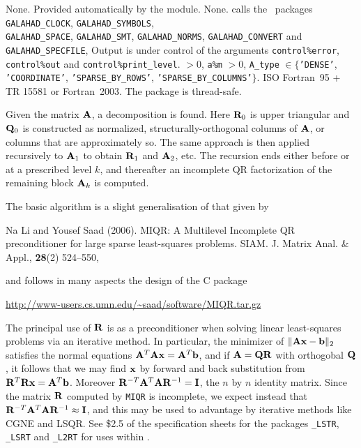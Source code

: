 \documentclass{galahad}
\newcommand{\packagename}{MIQR}
\begin{document}

\galgeneral

\galcommon None.
\galworkspace Provided automatically by the module.
\galroutines None.
\galmodules {\tt \packagename\_form} calls the \galahad\ packages
{\tt GALAHAD\_CLOCK},
{\tt GALAHAD\_SY\-M\-BOLS}, \\
{\tt GALAHAD\-\_SPACE},
{\tt GALAHAD\_SMT},
{\tt GALAHAD\_NORMS},
{\tt GALAHAD\_CONVERT} and
{\tt GALAHAD\_SPECFILE},
\galio Output is under control of the arguments
 {\tt control\%error}, {\tt control\%out} and {\tt control\%print\_level}.
 $> 0$, {\tt a\%m} $>  0$,
{\tt A\_type} $\in \{${\tt 'DENSE'},  {\tt 'COORDINATE'},
{\tt 'SPARSE\_BY\_ROWS'}, {\tt 'SPARSE\_BY\_COLUMNS'}$\}$.
\galportability ISO Fortran~95 + TR 15581 or Fortran~2003.
The package is thread-safe.



\galmethod

Given the matrix ${\mathbf{A}}$, a decomposition
is found. Here ${\mathbf{R}}_0$ is upper triangular and
${\mathbf{Q}}_0$ is constructed as normalized,
structurally-orthogonal columns of ${\mathbf{A}}$, or columns that are approximately
so. The same approach is then applied
recursively to ${\mathbf{A}}_1$ to obtain ${\mathbf{R}}_1$ and ${\mathbf{A}}_2$, etc. The
recursion ends either before or at a prescribed level $k$, and thereafter
an incomplete QR factorization of the remaining block ${\mathbf{A}}_k$ is computed.

\noindent
The basic algorithm is a slight generalisation of that given by
\vspace*{1mm}

\noindent
Na Li and Yousef Saad (2006).
MIQR: A Multilevel Incomplete QR preconditioner for large sparse
least-squares problems.
SIAM. J. Matrix Anal. \& Appl., {\bf 28}(2) 524--550,
\vspace*{1mm}

\noindent
and follows in many aspects the design of the C package

\url{http://www-users.cs.umn.edu/~saad/software/MIQR.tar.gz}

\noindent
The principal use of ${\mathbf{R}}$ is as a preconditioner when solving
linear least-squares problems via an iterative method. In particular,
the minimizer of $\|{\mathbf{A}}{\mathbf{x}}-{\mathbf{b}}\|_2$ satisfies the normal equations
${\mathbf{A}}^T {\mathbf{A}} {\mathbf{x}} = {\mathbf{A}}^T {\mathbf{b}}$, and if ${\mathbf{A}} = {\mathbf{Q}} {\mathbf{R}}$
with orthogobal ${\mathbf{Q}}$, it follows
that we may find ${\mathbf{x}}$ by forward and back substitution from
${\mathbf{R}}^T {\mathbf{R}} {\mathbf{x}} = {\mathbf{A}}^T {\mathbf{b}}$. Moreover
${\mathbf{R}}^{-T} {\mathbf{A}}^T {\mathbf{A}} {\mathbf{R}}^{-1} = {\mathbf{I}}$,
the $n$ by $n$ identity matrix. Since the matrix ${\mathbf{R}}$
computed by {\tt \packagename} is incomplete, we expect instead that
${\mathbf{R}}^{-T} {\mathbf{A}}^T {\mathbf{A}} {\mathbf{R}}^{-1} \approx {\mathbf{I}}$, and this may be used
to advantage by iterative methods like CGNE and LSQR. See \$2.5 of
the specification sheets for the packages
{\tt \libraryname\_LSTR},
{\tt \libraryname\_LSRT}
and
{\tt \libraryname\_L2RT} for uses within \galahad.
\end{document}
